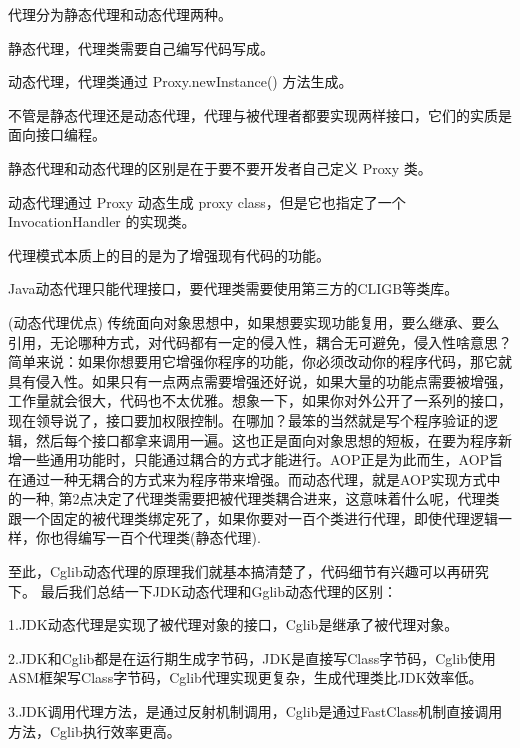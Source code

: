 代理分为静态代理和动态代理两种。

静态代理，代理类需要自己编写代码写成。

动态代理，代理类通过 Proxy.newInstance() 方法生成。

不管是静态代理还是动态代理，代理与被代理者都要实现两样接口，它们的实质是面向接口编程。

静态代理和动态代理的区别是在于要不要开发者自己定义 Proxy 类。

动态代理通过 Proxy 动态生成 proxy class，但是它也指定了一个 InvocationHandler 的实现类。

代理模式本质上的目的是为了增强现有代码的功能。

Java动态代理只能代理接口，要代理类需要使用第三方的CLIGB等类库。

(动态代理优点)
传统面向对象思想中，如果想要实现功能复用，要么继承、要么引用，无论哪种方式，对代码都有一定的侵入性，耦合无可避免，侵入性啥意思？简单来说：如果你想要用它增强你程序的功能，你必须改动你的程序代码，那它就具有侵入性。如果只有一点两点需要增强还好说，如果大量的功能点需要被增强，工作量就会很大，代码也不太优雅。想象一下，如果你对外公开了一系列的接口，现在领导说了，接口要加权限控制。在哪加？最笨的当然就是写个程序验证的逻辑，然后每个接口都拿来调用一遍。这也正是面向对象思想的短板，在要为程序新增一些通用功能时，只能通过耦合的方式才能进行。AOP正是为此而生，AOP旨在通过一种无耦合的方式来为程序带来增强。而动态代理，就是AOP实现方式中的一种, 第2点决定了代理类需要把被代理类耦合进来，这意味着什么呢，代理类跟一个固定的被代理类绑定死了，如果你要对一百个类进行代理，即使代理逻辑一样，你也得编写一百个代理类(静态代理).


至此，Cglib动态代理的原理我们就基本搞清楚了，代码细节有兴趣可以再研究下。
最后我们总结一下JDK动态代理和Gglib动态代理的区别：

1.JDK动态代理是实现了被代理对象的接口，Cglib是继承了被代理对象。

2.JDK和Cglib都是在运行期生成字节码，JDK是直接写Class字节码，Cglib使用ASM框架写Class字节码，Cglib代理实现更复杂，生成代理类比JDK效率低。

3.JDK调用代理方法，是通过反射机制调用，Cglib是通过FastClass机制直接调用方法，Cglib执行效率更高。